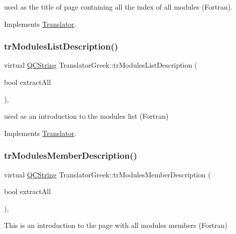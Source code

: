 used as the title of page containing all the index of all modules (Fortran). 

Implements \mbox{\hyperlink{class_translator}{Translator}}.

\mbox{\label{class_translator_greek_a2cff10ec76d16787fb67b6b14f8338e7}} 
\subsubsection{\texorpdfstring{trModulesListDescription()}{trModulesListDescription()}}
{\footnotesize\ttfamily virtual \mbox{\hyperlink{class_q_c_string}{Q\+C\+String}} Translator\+Greek\+::tr\+Modules\+List\+Description (\begin{DoxyParamCaption}\item[{bool}]{extract\+All }\end{DoxyParamCaption})\hspace{0.3cm}{\ttfamily [inline]}, {\ttfamily [virtual]}}

used as an introduction to the modules list (Fortran) 

Implements \mbox{\hyperlink{class_translator}{Translator}}.

\mbox{\label{class_translator_greek_af9a120937bf57581baa327cff7360f25}} 
\subsubsection{\texorpdfstring{trModulesMemberDescription()}{trModulesMemberDescription()}}
{\footnotesize\ttfamily virtual \mbox{\hyperlink{class_q_c_string}{Q\+C\+String}} Translator\+Greek\+::tr\+Modules\+Member\+Description (\begin{DoxyParamCaption}\item[{bool}]{extract\+All }\end{DoxyParamCaption})\hspace{0.3cm}{\ttfamily [inline]}, {\ttfamily [virtual]}}

This is an introduction to the page with all modules members (Fortran) 

